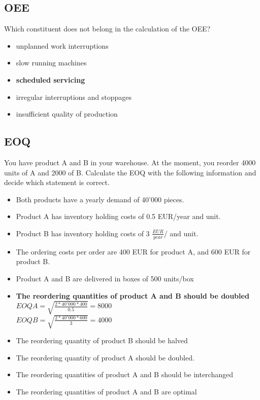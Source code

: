 \subsection{OEE}
Which constituent does not belong in the calculation of the OEE?
\begin{itemize}
	\item unplanned work interruptions
	\item slow running machines
	\item \textbf{scheduled servicing\\}
\item irregular interruptions and stoppages
\item insufficient quality of production
\end{itemize}
\subsection{EOQ}
You have product A and B in your warehouse. At the moment, you reorder 4000 units of A and 2000 of B. Calculate the EOQ with the following information and decide which statement is correct.
\begin{itemize}
\item Both products have a yearly demand of 40'000 pieces.
\item Product A has inventory holding costs of 0.5 EUR/year and unit.
\item Product B has inventory holding costs of 3 $\frac{EUR}{year}$/ and unit.
\item The ordering costs per order are 400 EUR for product A, and 600 EUR for product B. 
\item Product A and B are delivered in boxes of 500 units/box
\end{itemize}

\begin{itemize}
\item \textbf{The reordering quantities of product A and B should be doubled}\\
$EOQ A = \sqrt{\frac{2*40'000*400}{0.5}} = 8000$\\
	$EOQ B = \sqrt{\frac{2*40'000*600}{3}}= 4000$
	\item The reordering quantity of product B should be halved
	\item The reordering quantity of product A should be doubled. 
	\item The reordering quantities of product A and B should be interchanged
	\item The reordering quantities of product A and B are optimal
\end{itemize}
